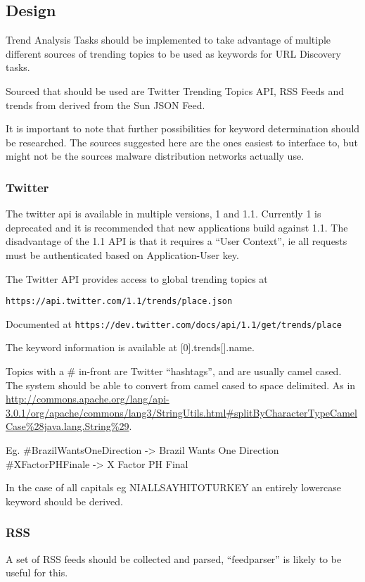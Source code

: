 \subsection{Design}
Trend Analysis Tasks should be implemented to take advantage of multiple different sources of trending topics to be used as keywords for URL Discovery tasks.

Sourced that should be used are Twitter Trending Topics API, RSS Feeds and trends from derived from the Sun JSON Feed.

It is important to note that further possibilities for keyword determination should be researched. The sources suggested here are the ones easiest to interface to, but might not be the sources malware distribution networks actually use.

\subsubsection{Twitter}
The twitter api is available in multiple versions, 1 and 1.1. Currently 1 is deprecated and it is recommended that new applications build against 1.1.  The disadvantage of the 1.1 API is that it requires a ``User Context'', ie all requests must be authenticated based on Application-User key.

The Twitter API provides access to global trending topics at

\verb`https://api.twitter.com/1.1/trends/place.json`

Documented at \verb`https://dev.twitter.com/docs/api/1.1/get/trends/place`

The keyword information is available at [0].trends[].name.

Topics with a \# in-front are Twitter ``hashtags'', and are usually camel cased. The system should be able to convert from camel cased to space delimited. As in \url{http://commons.apache.org/lang/api-3.0.1/org/apache/commons/lang3/StringUtils.html#splitByCharacterTypeCamelCase%28java.lang.String%29}.

Eg. \#BrazilWantsOneDirection -> Brazil Wants One Direction
\#XFactorPHFinale -> X Factor PH Final

In the case of all capitals eg NIALLSAYHITOTURKEY an entirely lowercase keyword should be derived.

\subsubsection{RSS}
A set of RSS feeds should be collected and parsed, ``feedparser'' is likely to be useful for this.

